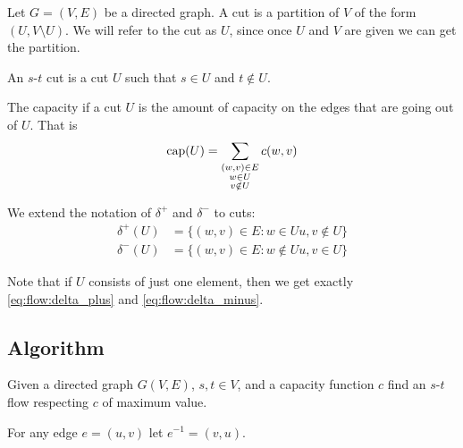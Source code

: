 \documentclass[14pt]{extarticle}
\begin{document}
\begin{definition}[cut]
    Let $G = (V, E)$ be a directed graph.
    A cut is a partition of $V$ of the form $(U, V \setminus U)$.
    We will refer to the cut as $U$, since once $U$ and $V$ are given we can get the partition.
\end{definition}

\begin{definition}[$s$-$t$ cut]
    An $s$-$t$ cut is a cut $U$ such that $s \in U$ and $t \notin U$.
\end{definition}

\begin{definition}
    The capacity if a cut $U$ is the amount of capacity on the edges that are going out of $U$.
    That is
    \begin{equation}
        {\operatorfont cap}(U) = \sum_{\substack{(w, v) \in E \\ w \in U \\ v \notin U}} c(w, v)
    \end{equation}
\end{definition}

\begin{remark}
    We extend the notation of $\delta^+$ and $\delta^-$ to cuts:
    \begin{align}
        \delta^+(U) & = \{(w, v) \in E : w \in U u, v \notin U\} \\
        \delta^-(U) & = \{(w, v) \in E : w \notin U u, v \in U\}
    \end{align}

    Note that if $U$ consists of just one element, then we get exactly \autoref{eq:flow:delta_plus} and \autoref{eq:flow:delta_minus}.
\end{remark}

\subsection{Algorithm}

\begin{definition}
    Given a directed graph $G(V, E)$, $s, t \in V$, and a capacity function $c$ find an $s$-$t$ flow respecting $c$ of maximum value.
\end{definition}

\begin{definition}
    For any edge $e = (u,v)$ let $e^{-1} = (v,u)$.
\end{definition}
\end{document}
